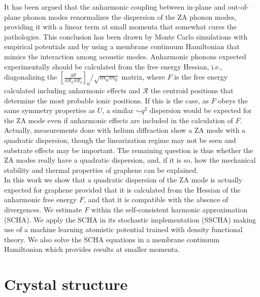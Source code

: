 It has been argued\cite{wang2016anharmonic,los2009scaling,katsnelson2013graphene,zakharchenko2009finite,mariani2008flexural,amorim2014thermodynamics,de2012bending} that the anharmonic coupling between in-plane and out-of-plane phonon 
modes renormalizes the dispersion of the ZA phonon modes, providing it with a linear term at small momenta that 
somewhat cures the pathologies. This conclusion has been drawn by Monte Carlo simulations with empirical 
potentials\cite{wang2016anharmonic,los2009scaling,katsnelson2013graphene,zakharchenko2009finite} and by using a 
membrane continuum  Hamiltonian that mimics the interaction among acoustic 
modes\cite{mariani2008flexural,amorim2014thermodynamics,de2012bending}. Anharmonic phonons expected experimentally 
should be calculated from the free energy Hessian, i.e., diagonalizing the  $[\frac{\partial F}{\partial \mathcal{R}_a \partial \mathcal{R}_b}]_{0}/\sqrt{m_am_b}$ matrix, where $F$ is the free energy calculated including anharmonic 
effects and $\boldsymbol{\mathcal{R}}$ the centroid positions that determine the most probable ionic 
positions\cite{bianco2017second}. If this is the case, as $F$ obeys the same symmetry properties as $U$, a similar 
$\sim q^2$ dispersion would be expected for the ZA mode even if anharmonic effects are included in the calculation 
of $F$. Actually, measurements done with helium diffraction show a ZA mode with a quadratic 
dispersion\cite{al2016acoustic,al2015helium,al2018resolving}, though the linearization regime may not be seen and 
substrate effects may be important. The remaining question is thus whether the ZA modes really have a quadratic 
dispersion, and, if it is so, how the mechanical stability and thermal properties of graphene can be explained. \\

In this work we show that a quadratic dispersion of the ZA mode is actually expected for graphene provided that it 
is calculated from the Hessian of the anharmonic free energy $F$, and that it is compatible with the absence of 
divergences. We estimate $F$ within the self-consistent harmonic approximation (SCHA). We apply the SCHA in its 
stochastic implementation (SSCHA) making use of a machine learning atomistic potential trained with density 
functional theory\cite{rowe2018development}. We also solve the SCHA equations in a membrane continuum Hamiltonian 
which provides results at smaller momenta.

\section{Crystal structure}

